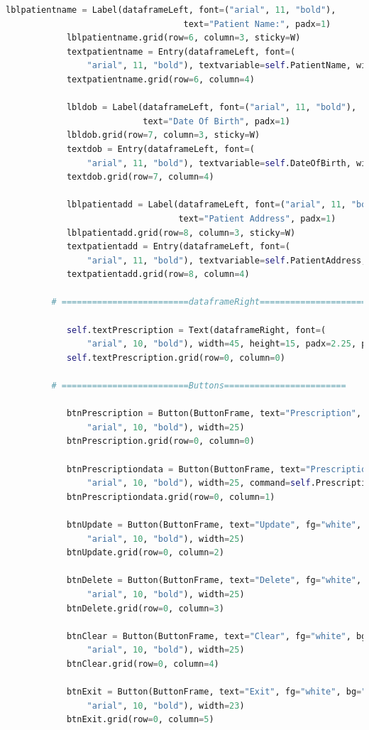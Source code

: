 \documentclass{article}
\begin{document}
\begin{lstlisting}[language=Python, caption=Hospital Management.py]
			lblpatientname = Label(dataframeLeft, font=("arial", 11, "bold"),
								   text="Patient Name:", padx=1)
			lblpatientname.grid(row=6, column=3, sticky=W)
			textpatientname = Entry(dataframeLeft, font=(
				"arial", 11, "bold"), textvariable=self.PatientName, width=25)
			textpatientname.grid(row=6, column=4)
	
			lbldob = Label(dataframeLeft, font=("arial", 11, "bold"),
						   text="Date Of Birth", padx=1)
			lbldob.grid(row=7, column=3, sticky=W)
			textdob = Entry(dataframeLeft, font=(
				"arial", 11, "bold"), textvariable=self.DateOfBirth, width=25)
			textdob.grid(row=7, column=4)
	
			lblpatientadd = Label(dataframeLeft, font=("arial", 11, "bold"),
								  text="Patient Address", padx=1)
			lblpatientadd.grid(row=8, column=3, sticky=W)
			textpatientadd = Entry(dataframeLeft, font=(
				"arial", 11, "bold"), textvariable=self.PatientAddress, width=25)
			textpatientadd.grid(row=8, column=4)
	
		 # =========================dataframeRight========================
	
			self.textPrescription = Text(dataframeRight, font=(
				"arial", 10, "bold"), width=45, height=15, padx=2.25, pady=6)
			self.textPrescription.grid(row=0, column=0)
	
		 # =========================Buttons========================
	
			btnPrescription = Button(ButtonFrame, text="Prescription", fg="white", bg="green", font=(
				"arial", 10, "bold"), width=25)
			btnPrescription.grid(row=0, column=0)
	
			btnPrescriptiondata = Button(ButtonFrame, text="Prescription Data", fg="white", bg="green", font=(
				"arial", 10, "bold"), width=25, command=self.PrescriptionData)
			btnPrescriptiondata.grid(row=0, column=1)
	
			btnUpdate = Button(ButtonFrame, text="Update", fg="white", bg="green", font=(
				"arial", 10, "bold"), width=25)
			btnUpdate.grid(row=0, column=2)
	
			btnDelete = Button(ButtonFrame, text="Delete", fg="white", bg="green", font=(
				"arial", 10, "bold"), width=25)
			btnDelete.grid(row=0, column=3)
	
			btnClear = Button(ButtonFrame, text="Clear", fg="white", bg="green", font=(
				"arial", 10, "bold"), width=25)
			btnClear.grid(row=0, column=4)
	
			btnExit = Button(ButtonFrame, text="Exit", fg="white", bg="green", font=(
				"arial", 10, "bold"), width=23)
			btnExit.grid(row=0, column=5)
		

\end{lstlisting}
\end{document}
